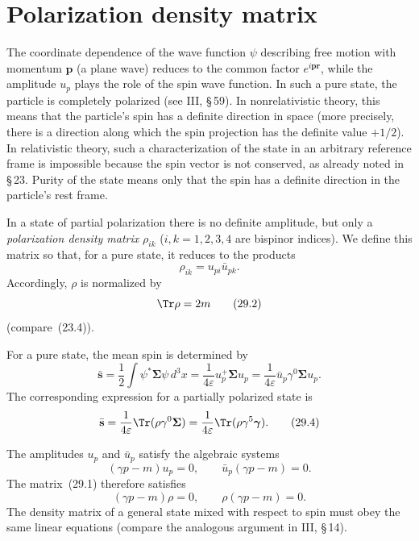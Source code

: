 \section{Polarization density matrix}

The coordinate dependence of the wave function $\psi$ describing free motion with momentum $\mathbf{p}$ (a plane wave) reduces to the common factor $e^{i\mathbf{p}\mathbf{r}}$, while the amplitude $u_p$ plays the role of the spin wave function. In such a pure state, the particle is completely polarized (see III, \S\,59). In nonrelativistic theory, this means that the particle's spin has a definite direction in space (more precisely, there is a direction along which the spin projection has the definite value $+1/2$). In relativistic theory, such a characterization of the state in an arbitrary reference frame is impossible because the spin vector is not conserved, as already noted in \S\,23. Purity of the state means only that the spin has a definite direction in the particle's rest frame.

In a state of partial polarization there is no definite amplitude, but only a \emph{polarization density matrix} $\rho_{ik}$ ($i, k = 1, 2, 3, 4$ are bispinor indices). We define this matrix so that, for a pure state, it reduces to the products
\begin{equation}
\rho_{ik} = u_{pi}\bar u_{pk}.
\tag{29.1}
\end{equation}
Accordingly, $\rho$ is normalized by
\begin{equation}
\Tr\rho = 2m
\tag{29.2}
\end{equation}
(compare~(23.4)).

For a pure state, the mean spin is determined by
\begin{equation}
\bar{\mathbf{s}} = \frac{1}{2}\int\psi^*\boldsymbol{\Sigma}\psi\,d^3x = \frac{1}{4\varepsilon}u^+_p\boldsymbol{\Sigma}u_p = \frac{1}{4\varepsilon}\bar u_p\gamma^0\boldsymbol{\Sigma}u_p.
\tag{29.3}
\end{equation}
The corresponding expression for a partially polarized state is
\begin{equation}
\bar{\mathbf{s}} = \frac{1}{4\varepsilon}\Tr(\rho\gamma^0\boldsymbol{\Sigma}) = \frac{1}{4\varepsilon}\Tr(\rho\gamma^5\boldsymbol{\gamma}).
\tag{29.4}
\end{equation}

The amplitudes $u_p$ and $\bar u_p$ satisfy the algebraic systems
\[
(\gamma p - m)u_p = 0,\qquad \bar u_p(\gamma p - m) = 0.
\]
The matrix~(29.1) therefore satisfies
\begin{equation}
(\gamma p - m)\rho = 0,\qquad \rho(\gamma p - m) = 0.
\tag{29.5}
\end{equation}
The density matrix of a general state mixed with respect to spin must obey the same linear equations (compare the analogous argument in III, \S\,14).

